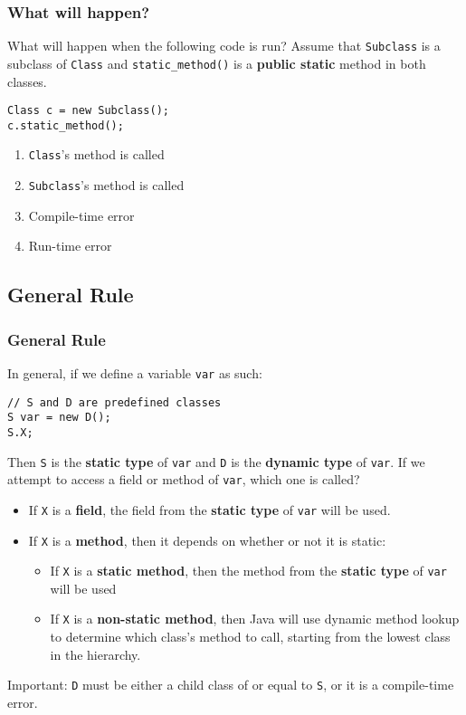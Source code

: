 \documentclass[9pt]{beamer}
\begin{document}
\begin{frame}[fragile]
  \frametitle{What will happen?}
  What will happen when the following code is run? Assume that {\tt Subclass} is
  a subclass of {\tt Class} and {\tt static\_method()} is a {\bf public static} method
  in both classes.
  \begin{lstlisting}
Class c = new Subclass();
c.static_method();
  \end{lstlisting}
  \begin{enumerate}
    \item
      \alert<2>{{\tt Class}'s method is called}
    \item
      {\tt Subclass}'s method is called
    \item
      Compile-time error
    \item
      Run-time error
  \end{enumerate}
\end{frame}

\subsection{General Rule}
\begin{frame}[fragile]
  \frametitle{General Rule}
  In general, if we define a variable {\tt var} as such:
  \begin{lstlisting}
// S and D are predefined classes
S var = new D();
S.X;
  \end{lstlisting}
  Then {\tt S} is the {\bf static type} of {\tt var} and {\tt D} is the {\bf
  dynamic type} of {\tt var}. If we attempt to access a field or method of
  {\tt var}, which one is called?

  \begin{itemize}
    \item
      If {\tt X} is a {\bf field}, the field from the {\bf static type} of
      {\tt var} will be used.
    \item
      If {\tt X} is a {\bf method}, then it depends on whether or not it is
      static:
      \begin{itemize}
        \item
          If {\tt X} is a {\bf static method}, then the method from the {\bf
          static type} of {\tt var} will be used
        \item
          If {\tt X} is a {\bf non-static method}, then Java will use
          dynamic method lookup to determine which class's method to call,
          starting from the lowest class in the hierarchy.
      \end{itemize}
  \end{itemize}

  \begin{framed}
    Important: {\tt D} must be either a child class of or equal to {\tt S},
    or it is a compile-time error.
  \end{framed}
\end{frame}
\end{document}
